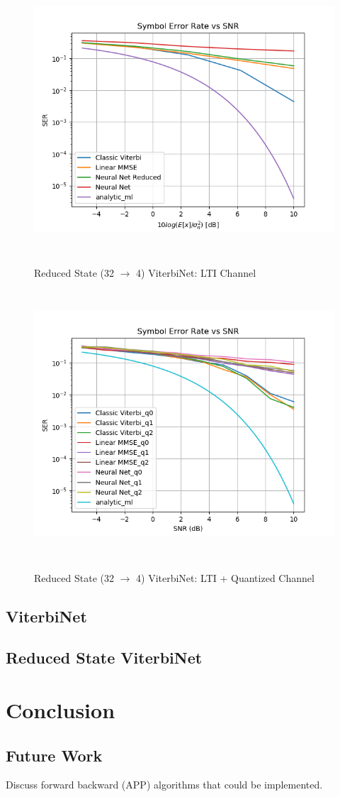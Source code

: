 \documentclass[12pt,a4paper]{report}
\begin{document}
\begin{figure}[H]
	  \caption{Reduced State (32 $\rightarrow$ 4) ViterbiNet: LTI Channel}
	\includegraphics[width=\textwidth,height = 10cm]{results/lti_reduced}
	  \label{fig:reduced_lti}
\end{figure}

\begin{figure}[H]
	  \caption{Reduced State (32 $\rightarrow$ 4) ViterbiNet: LTI + Quantized Channel}
	\includegraphics[width=\textwidth,height = 10cm]{results/quantized_reduced}
	  \label{fig:reduced_lti_quantized}
\end{figure}


\subsection*{ViterbiNet}
\subsection*{Reduced State ViterbiNet}
\section{Conclusion}
\subsection{Future Work}
Discuss forward backward (APP) algorithms that could be implemented.

\newpage

\end{document}
